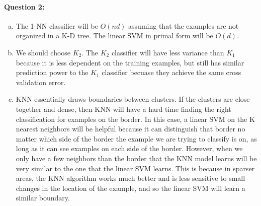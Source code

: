 \documentclass[letterpaper,11pt]{article}
\begin{document}
\paragraph{Question 2:}
\begin{enumerate}[(a)]
\item The 1-NN classifier will be $O(n d)$ assuming that the examples are not organized in
    a K-D tree. The linear SVM in primal form will be $O(d)$.
\item
    We should choose $K_2$. The $K_2$ classifier will have less variance than
    $K_1$ because it is less dependent on the training examples, but still has
    similar prediction power to the $K_1$ classifier becuase they achieve the
    same cross validation error.
\item
    KNN essentially draws boundaries between clusters. If the clusters are
    close together and dense, then KNN will have a hard time finding the
    right classification for examples on the border. In this case, a linear
    SVM on the K nearest neighbors will be helpful because it can distinguish
    that border no matter which side of the border the example we are trying
    to classify is on, as long as it can see examples on each side of the
    border. However, when we only have a few neighbors than the border that
    the KNN model learns will be very similar to the one that the linear
    SVM learns. This is because in sparser areas, the KNN algorithm works
    much better and is less sensitive to small changes in the location of
    the example, and so the linear SVM will learn a similar boundary.
\end{enumerate}
\end{document}
